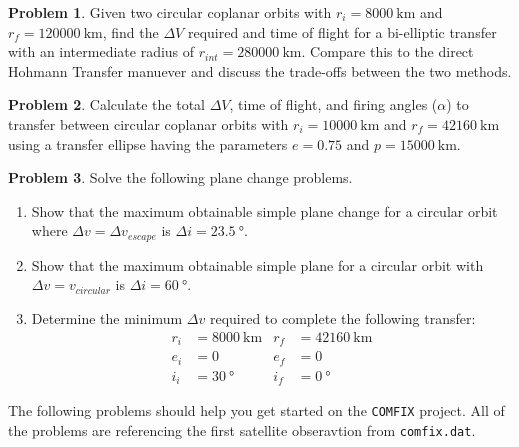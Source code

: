 \documentclass[10pt]{article}
\theoremstyle{definition}
\newtheorem{prob}{Problem}[section]
\newenvironment{subprob}%
{\renewcommand{\theenumi}{\alph{enumi}}\renewcommand{\labelenumi}{(\theenumi)}\begin{enumerate}}%
{\end{enumerate}}%
\begin{document}
\begin{prob}
    Given two circular coplanar orbits with \( r_i = \SI{8000}{\kilo\meter}\) and \( r_f = \SI{120000}{\kilo\meter}\), find the \( \Delta V \) required and time of flight for a bi-elliptic transfer with an intermediate radius of \( r_{int} = \SI{280000}{\kilo\meter}\). 
    Compare this to the direct Hohmann Transfer manuever and discuss the trade-offs between the two methods.
\end{prob}

\begin{prob} 
    Calculate the total \( \Delta V \), time of flight, and firing angles (\(\alpha\)) to transfer between circular coplanar orbits with \( r_i = \SI{10000}{\kilo\meter}\) and \( r_f = \SI{42160}{\kilo\meter}\) using a transfer ellipse having the parameters \( e = 0.75\) and \( p = \SI{15000}{\kilo\meter}\).
\end{prob}

\begin{prob}
    Solve the following plane change problems.
    \begin{subprob}
    \item Show that the maximum obtainable simple plane change for a circular orbit where \( \Delta v = \Delta v_{escape} \) is \( \Delta i = \SI{23.5}{\degree}\).
    \item Show that the maximum obtainable simple plane for a circular orbit with \( \Delta v = v_{circular}\) is \( \Delta i = \SI{60}{\degree}\).
    \item Determine the minimum  \( \Delta v \) required to complete the following transfer:
        \begin{align*}
            r_i &= \SI{8000}{\kilo\meter} &r_f &= \SI{42160}{\kilo\meter} \\
            e_i &= 0  &e_f &= 0 \\
            i_i &= \SI{30}{\degree} &i_f&=\SI{0}{\degree}
        \end{align*}
    \end{subprob}
\end{prob}

\noindent The following problems should help you get started on the \texttt{COMFIX} project.
All of the problems are referencing the first satellite obseravtion from \texttt{comfix.dat}.
\end{document}
